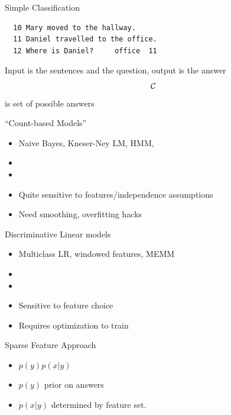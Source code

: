 \documentclass{beamer}
\begin{document}
\begin{frame}{Simple Classification}
\begin{verbatim}
  10 Mary moved to the hallway.
  11 Daniel travelled to the office.
  12 Where is Daniel?     office  11
\end{verbatim}

  Input is the sentences and the question, output is the answer
  \[ \mathcal{C} \] is set of possible answers 
\end{frame}



\begin{frame}{}
  ``Count-based Models''
  \begin{itemize}
  \item Naive Bayes, Kneser-Ney LM, HMM, 
  \end{itemize}

  \pause

  \begin{itemize}
  \item {}
  \item {}
  \item \alert{Quite sensitive to features/independence assumptions}
  \item \alert{Need smoothing, overfitting hacks}
  \end{itemize}
\end{frame}

\begin{frame}
  Discriminative Linear models
  \air 

  \begin{itemize}
  \item Multiclass LR, windowed features, MEMM
  \end{itemize}
  \pause
  
  \begin{itemize}
  \item {}
  \item {}
  \item \alert{Sensitive to feature choice}
  \item \alert{Requires optimization to train}
  \end{itemize}
\end{frame}


\begin{frame}{Sparse Feature Approach}
  \begin{itemize}
  \item $p(y) p(x|y)$
  \end{itemize}
  \begin{itemize}
  \item $p(y)$ prior on answers
  \item $p(x|y)$ determined by feature set.  
  \end{itemize}
\end{frame}
\end{document}
